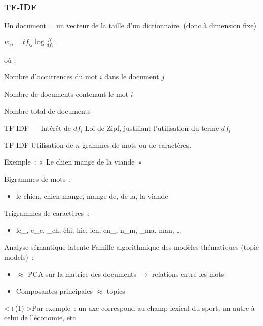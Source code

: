 \begin{frame}
  \frametitle{TF-IDF}
  Un document = un vecteur de la taille d'un dictionnaire. (donc à dimension fixe) \\
  \begin{center}
    $\boxed{w_{ij} = tf_{ij}\log{\frac{N}{df_i}}}$
  \end{center}
  où :

  \begin{description}[<+->]
    \item[$tf_{ij}$] Nombre d'occurrences du mot $i$ dans le document $j$
    \item[$df_i$] Nombre de documents contenant le mot $i$
    \item[$N$] Nombre total de documents
  \end{description}
\end{frame}

\begin{frame}{TF-IDF --- Intérêt de $df_i$}
  Loi de Zipf, justifiant l'utilisation du terme $df_i$
\end{frame}

\begin{frame}{TF-IDF}
  Utilisation de $n$-grammes de mots ou de caractères.
  \begin{center}
  Exemple~: «~Le chien mange de la viande~»
  \end{center}

  Bigrammes de mots~:

  \begin{itemize}
  \item le-chien, chien-mange, mange-de, de-la, la-viande
  \end{itemize}

  Trigrammes de caractères~:

  \begin{itemize}
  \item le\_, e\_c, \_ch, chi, hie, ien, en\_, n\_m, \_ma, man, …
  \end{itemize}
\end{frame}

\begin{frame}{Analyse sémantique latente}
  Famille algorithmique des modèles thématiques (topic models)~:

  \begin{itemize}[<+(1)->]
    \item $\approx$ PCA sur la matrice des documents $\rightarrow$ relations entre les mots
    \item Composantes principales $\approx$ topics
  \end{itemize}

  \onslide<+(1)->{Par exemple~: un axe correspond au champ lexical du sport, un autre à celui de l'économie, etc.}
\end{frame}

